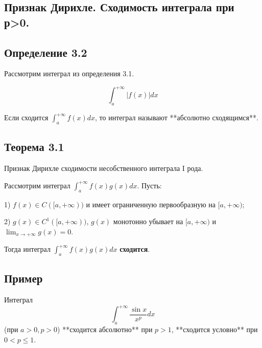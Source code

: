 {
\subsection{Признак Дирихле. Сходимость интеграла при р>0.}

\subsection*{Определение 3.2}

Рассмотрим интеграл из определения 3.1.



\[
\int_{a}^{+\infty} |f(x)| dx
\]



Если сходится \( \int_{a}^{+\infty} f(x) dx \), то интеграл называют **абсолютно сходящимся**.

\subsection*{Теорема 3.1}

Признак Дирихле сходимости несобственного интеграла I рода.

Рассмотрим интеграл \( \int_{a}^{+\infty} f(x)g(x)dx \). Пусть:

1) \( f(x) \in C([a, +\infty)) \) и имеет ограниченную первообразную на \( [a, +\infty) \);

2) \( g(x) \in C^1([a, +\infty)) \), \( g(x) \) монотонно убывает на \( [a, +\infty) \) и \( \lim_{x \to +\infty} g(x) = 0 \).

Тогда интеграл \( \int_{a}^{+\infty} f(x)g(x)dx \) \textbf{сходится}.

\subsection*{Пример}
Интеграл 
\[
\int_{a}^{+\infty} \frac{\sin x}{x^p} dx
\]
(при \( a > 0, p > 0 \)) **сходится абсолютно** при \( p > 1 \), **сходится условно** при \( 0 < p \leq 1 \).



}